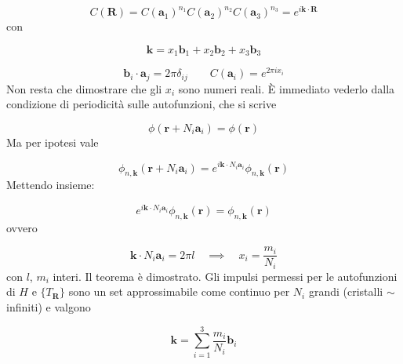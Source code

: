 \documentclass[a4paper]{report}
\begin{document}
\begin{equation}
    C(\mathbf{R}) = C(\mathbf{a}_1)^{n_1} C(\mathbf{a}_2)^{n_2} C(\mathbf{a}_3)^{n_3} = e^{i\mathbf{k}\cdot \mathbf{R}}
\end{equation}
con

\begin{equation}
    \mathbf{k} = x_1\mathbf{b}_1 + x_2\mathbf{b}_2 + x_3\mathbf{b}_3 
\end{equation}

\begin{equation}
   \mathbf{b}_i\cdot \mathbf{a}_j = 2\pi\delta_{ij}\qquad C(\mathbf{a}_i) = e^{2\pi i x_i}
\end{equation}
Non resta che dimostrare che gli $x_i$ sono numeri reali. È immediato vederlo dalla condizione di periodicità sulle autofunzioni, che si scrive

\begin{equation}
    \phi(\mathbf{r} + N_i \mathbf{a}_i) = \phi(\mathbf{r})
\end{equation}
Ma per ipotesi vale

\begin{equation}
    \phi_{n,\mathbf{k}}(\mathbf{r} + N_i \mathbf{a}_i) = e^{i\mathbf{k} \cdot N_i \mathbf{a}_i} \phi_{n,\mathbf{k}}(\mathbf{r})
\end{equation}
Mettendo insieme:

\begin{equation}
    e^{i\mathbf{k} \cdot N_i \mathbf{a}_i} \phi_{n,\mathbf{k}}(\mathbf{r}) = \phi_{n,\mathbf{k}}(\mathbf{r}) 
\end{equation}
ovvero

\begin{equation}
    \mathbf{k}\cdot N_i \mathbf{a}_i = 2\pi l \quad \implies \quad x_i = \frac{m_i}{N_i}
\end{equation}
con $l$, $m_i$ interi. Il teorema è dimostrato. Gli impulsi permessi per le autofunzioni di $H$ e $\{T_{\mathbf{R}}\}$ sono un set approssimabile come continuo per $N_i$ grandi (cristalli $\sim$ infiniti) e valgono

\begin{equation}
    \mathbf{k} = \sum_{i=1}^{3} \frac{m_i}{N_i}\mathbf{b}_i
\end{equation}
\end{document}
